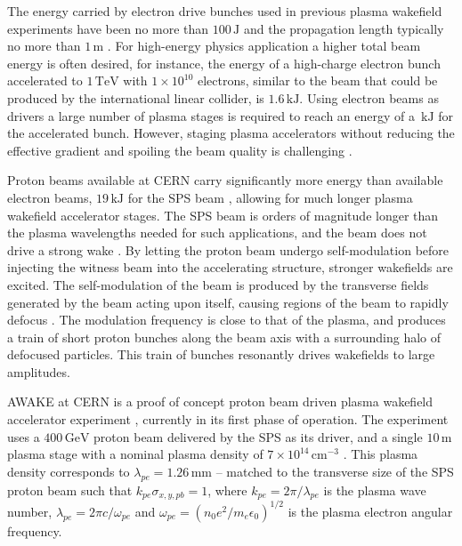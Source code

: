 \documentclass[aps,prstab,reprint,amsmath,amssymb,groupedaddress]{revtex4-1}
\newcommand{\unit}[1]{\,\mathrm{#1}}
\newcommand{\nexp}[1]{\times 10^{#1}}
\begin{document}
The energy carried by electron drive bunches used in previous plasma wakefield experiments have been no more than
$100\unit{J}$ and the propagation length typically no more than $1\unit{m}$ \cite{blumenfeld:2007,caldwell:2009}.
For high-energy physics application a higher total beam energy is often desired, for instance, the energy of a
high-charge electron bunch accelerated to $1\unit{TeV}$ with $1\nexp{10}$ electrons, similar to the beam that could be
produced by the international linear collider, is $1.6\unit{kJ}$. Using electron beams as drivers a large number of
plasma stages is required to reach an energy of a $\unit{kJ}$ for the accelerated bunch. However, staging plasma
accelerators without reducing the effective gradient and spoiling the beam quality is challenging
\cite{steinke:2016,lindstrom:2016}.

Proton beams available at CERN carry significantly more energy than available electron beams, $19\unit{kJ}$ for the SPS
beam \cite{gschwendtner:2016}, allowing for much longer plasma wakefield accelerator stages. The SPS beam is orders of
magnitude longer than the plasma wavelengths needed for such applications, and the beam does not drive a strong wake
\cite{gschwendtner:2016}. By letting the proton beam undergo self-modulation before injecting the witness beam into the %
accelerating structure, stronger wakefields are excited. The self-modulation of the beam is produced by the transverse
fields generated by the beam acting upon itself, causing regions of the beam to rapidly defocus \cite{kumar:2010}. The
modulation frequency is close to that of the plasma, and produces a train of short proton bunches along the beam axis
with a surrounding halo of defocused particles. This train of bunches resonantly drives wakefields to large amplitudes.

AWAKE at CERN is a proof of concept proton beam driven plasma wakefield accelerator experiment
\cite{awake_collaboration:2014}, currently in its first phase of operation. The experiment uses a $400\unit{GeV}$ proton
beam delivered by the SPS as its driver, and a single $10\unit{m}$ plasma stage with a nominal plasma density of
$7\nexp{14}\unit{cm}^{-3}$ \cite{gschwendtner:2016}. This plasma density corresponds to $\lambda_{pe} = 1.26\unit{mm}$
-- matched to the transverse size of the SPS proton beam such that $k_{pe}\sigma_{x,y,pb} = 1$, where
$k_{pe} = 2\pi/\lambda_{pe}$ is the plasma wave number, $\lambda_{pe}=2\pi c/\omega_{pe}$ and
$\omega_{pe}=\left(n_0e^2/m_e\epsilon_0\right)^{1/2}$ is the plasma electron angular frequency.
\end{document}
